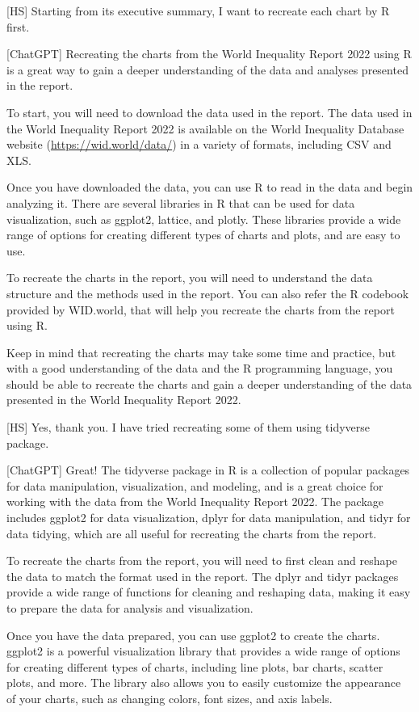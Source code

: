 \documentclass[
]{bxjsbook}
\theoremstyle{definition}
\theoremstyle{definition}
\theoremstyle{definition}
\theoremstyle{definition}
\theoremstyle{remark}
\begin{document}
{[}HS{]} Starting from its executive summary, I want to recreate each chart by R first.

{[}ChatGPT{]} Recreating the charts from the World Inequality Report 2022 using R is a great way to gain a deeper understanding of the data and analyses presented in the report.

To start, you will need to download the data used in the report. The data used in the World Inequality Report 2022 is available on the World Inequality Database website (\url{https://wid.world/data/}) in a variety of formats, including CSV and XLS.

Once you have downloaded the data, you can use R to read in the data and begin analyzing it. There are several libraries in R that can be used for data visualization, such as ggplot2, lattice, and plotly. These libraries provide a wide range of options for creating different types of charts and plots, and are easy to use.

To recreate the charts in the report, you will need to understand the data structure and the methods used in the report. You can also refer the R codebook provided by WID.world, that will help you recreate the charts from the report using R.

Keep in mind that recreating the charts may take some time and practice, but with a good understanding of the data and the R programming language, you should be able to recreate the charts and gain a deeper understanding of the data presented in the World Inequality Report 2022.

{[}HS{]} Yes, thank you. I have tried recreating some of them using tidyverse package.

{[}ChatGPT{]} Great! The tidyverse package in R is a collection of popular packages for data manipulation, visualization, and modeling, and is a great choice for working with the data from the World Inequality Report 2022. The package includes ggplot2 for data visualization, dplyr for data manipulation, and tidyr for data tidying, which are all useful for recreating the charts from the report.

To recreate the charts from the report, you will need to first clean and reshape the data to match the format used in the report. The dplyr and tidyr packages provide a wide range of functions for cleaning and reshaping data, making it easy to prepare the data for analysis and visualization.

Once you have the data prepared, you can use ggplot2 to create the charts. ggplot2 is a powerful visualization library that provides a wide range of options for creating different types of charts, including line plots, bar charts, scatter plots, and more. The library also allows you to easily customize the appearance of your charts, such as changing colors, font sizes, and axis labels.
\end{document}
